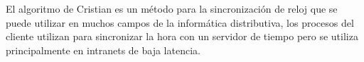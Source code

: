 
El algoritmo de Cristian es un método para la sincronización de reloj que se
puede utilizar en muchos campos de la informática distributiva, los procesos
del cliente utilizan para sincronizar la hora con un servidor de
tiempo pero se utiliza principalmente en intranets de baja latencia.
